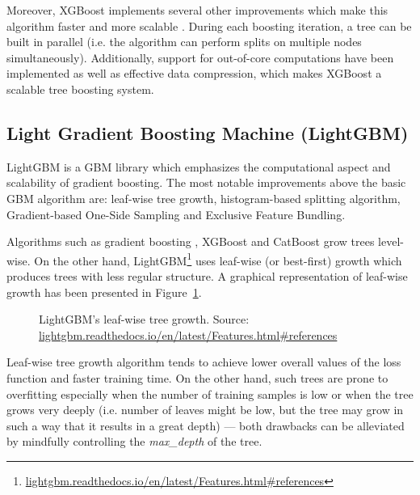 \documentclass[magisterska, english]{pwr_wmat_praca_dyplomowa}
\theoremstyle{plain}
\numberwithin{theorem}{chapter}
\theoremstyle{definition}
\numberwithin{theorem}{chapter}
\begin{document}
Moreover, XGBoost implements several other improvements which make this algorithm faster and more scalable \cite{xgboost}. During each boosting iteration, a tree can be built in parallel (i.e. the algorithm can perform splits on multiple nodes simultaneously). Additionally, support for out-of-core computations have been implemented as well as effective data compression, which makes XGBoost a scalable tree boosting system.

\subsection{Light Gradient Boosting Machine (LightGBM)}\label{section:lightgbm}
LightGBM \cite{lightgbm} is a GBM library which emphasizes the computational aspect and scalability of gradient boosting. The most notable improvements above the basic GBM algorithm \cite{friedman_gbm} are: leaf-wise tree growth, histogram-based splitting algorithm, Gradient-based One-Side Sampling and Exclusive Feature Bundling.

Algorithms such as gradient boosting \cite{friedman_gbm}, XGBoost \cite{xgboost} and CatBoost \cite{catboost} grow trees level-wise. On the other hand, LightGBM\footnote{\url{lightgbm.readthedocs.io/en/latest/Features.html\#references}} uses leaf-wise (or best-first) growth which produces trees with less regular structure. A graphical representation of leaf-wise growth has been presented in Figure~\ref{fig:lightgbm_leaf_wise}.

\begin{figure}[H]
	\centering
	\caption{LightGBM's leaf-wise tree growth. Source: \url{lightgbm.readthedocs.io/en/latest/Features.html\#references}}
	\label{fig:lightgbm_leaf_wise}
\end{figure}

Leaf-wise tree growth algorithm tends to achieve lower overall values of the loss function and faster training time. On the other hand, such trees are prone to overfitting especially when the number of training samples is low or when the tree grows very deeply (i.e. number of leaves might be low, but the tree may grow in such a way that it results in a great depth) --- both drawbacks can be alleviated by mindfully controlling the \emph{max\_depth} of the tree.
\end{document}

